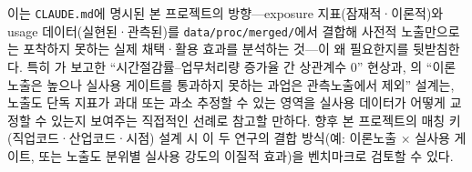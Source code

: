 \documentclass[11pt]{article}
\begin{document}
이는 \texttt{CLAUDE.md}에 명시된 본 프로젝트의 방향—exposure 지표(잠재적·이론적)와 usage 데이터(실현된·관측된)를 \texttt{data/proc/merged/}에서 결합해 사전적 노출만으로는 포착하지 못하는 실제 채택·활용 효과를 분석하는 것—이 왜 필요한지를 뒷받침한다. 특히 \citet{bok-2026-ai-adoption-productivity-effects}가 보고한 ``시간절감률--업무처리량 증가율 간 상관계수 0'' 현상과, \citet{massenkoff-2026-labor-market-impacts-of-ai}의 ``이론노출은 높으나 실사용 게이트를 통과하지 못하는 과업은 관측노출에서 제외'' 설계는, 노출도 단독 지표가 과대 또는 과소 추정할 수 있는 영역을 실사용 데이터가 어떻게 교정할 수 있는지 보여주는 직접적인 선례로 참고할 만하다. 향후 본 프로젝트의 매칭 키(직업코드·산업코드·시점) 설계 시 이 두 연구의 결합 방식(예: 이론노출 $\times$ 실사용 게이트, 또는 노출도 분위별 실사용 강도의 이질적 효과)을 벤치마크로 검토할 수 있다.

\clearpage
\printbibliography
\end{document}
